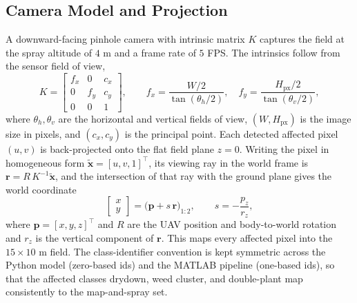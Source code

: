 \documentclass[12pt,a4paper]{article}
\begin{document}
\subsection{Camera Model and Projection}
A downward-facing pinhole camera with intrinsic matrix $K$ captures the field at the
spray altitude of $4$ m and a frame rate of $5$ FPS. The intrinsics follow from the
sensor field of view,
\begin{equation}
    K =
    \begin{bmatrix}
        f_x & 0   & c_x \\
        0   & f_y & c_y \\
        0   & 0   & 1
    \end{bmatrix},
    \qquad
    f_x = \frac{W/2}{\tan(\theta_h/2)}, \quad
    f_y = \frac{H_{\mathrm{px}}/2}{\tan(\theta_v/2)},
    \label{eq:intrinsics}
\end{equation}
where $\theta_h,\theta_v$ are the horizontal and vertical fields of view,
$(W,H_{\mathrm{px}})$ is the image size in pixels, and $(c_x,c_y)$ is the principal
point. Each detected affected pixel $(u,v)$ is back-projected onto the flat field plane
$z=0$. Writing the pixel in homogeneous form $\tilde{\mathbf{x}}=[u,v,1]^{\top}$, its
viewing ray in the world frame is $\mathbf{r}=R\,K^{-1}\tilde{\mathbf{x}}$, and the
intersection of that ray with the ground plane gives the world coordinate
\begin{equation}
    \begin{bmatrix} x \\ y \end{bmatrix}
    = \big( \mathbf{p} + s\,\mathbf{r} \big)_{1:2},
    \qquad
    s = -\frac{p_z}{r_z},
    \label{eq:backproj}
\end{equation}
where $\mathbf{p}=[x,y,z]^{\top}$ and $R$ are the UAV position and body-to-world
rotation and $r_z$ is the vertical component of $\mathbf{r}$. This maps every affected
pixel into the $15\times10$ m field. The class-identifier convention is kept symmetric
across the Python model (zero-based ids) and the MATLAB pipeline (one-based ids), so
that the affected classes drydown, weed cluster, and double-plant map consistently to
the map-and-spray set.
\end{document}
